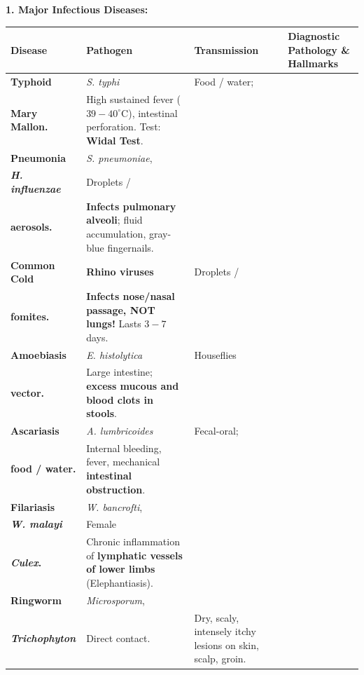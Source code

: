 \documentclass[10pt,twoside,openright]{book}
\begin{document}
\begin{conceptbox}
\textbf{1. Major Infectious Diseases:}
\begin{center}
\scriptsize
\setlength{\tabcolsep}{1.5pt}
\renewcommand{\arraystretch}{1.15}
\begin{tabularx}{\linewidth}{>{\bfseries\RaggedRight}p{1.7cm} >{\RaggedRight}p{2.2cm} >{\RaggedRight}p{1.6cm} >{\RaggedRight}X}
\toprule
\textbf{Disease} & \textbf{Pathogen} & \textbf{Transmission} & \textbf{Diagnostic Pathology \& Hallmarks} \\
\midrule
Typhoid & \textit{S. typhi} & Food / water;\\Mary Mallon. & High sustained fever ($39-40^\circ\mathrm{C}$), intestinal perforation. Test: \textbf{Widal Test}. \\
\midrule
Pneumonia & \textit{S. pneumoniae},\\ \textit{H. influenzae} & Droplets /\\aerosols. & \textbf{Infects pulmonary alveoli}; fluid accumulation, gray-blue fingernails. \\
\midrule
Common Cold & \textbf{Rhino viruses} & Droplets /\\fomites. & \textbf{Infects nose/nasal passage, NOT lungs!} Lasts $3-7$ days. \\
\midrule
Amoebiasis & \textit{E. histolytica} & Houseflies\\vector. & Large intestine; \textbf{excess mucous and blood clots in stools}. \\
\midrule
Ascariasis & \textit{A. lumbricoides} & Fecal-oral;\\food / water. & Internal bleeding, fever, mechanical \textbf{intestinal obstruction}. \\
\midrule
Filariasis & \textit{W. bancrofti},\\ \textit{W. malayi} & Female\\\textit{Culex}. & Chronic inflammation of \textbf{lymphatic vessels of lower limbs} (Elephantiasis). \\
\midrule
Ringworm & \textit{Microsporum},\\ \textit{Trichophyton} & Direct contact. & Dry, scaly, intensely itchy lesions on skin, scalp, groin. \\
\bottomrule
\end{tabularx}
\end{center}


\end{conceptbox}
\end{document}
